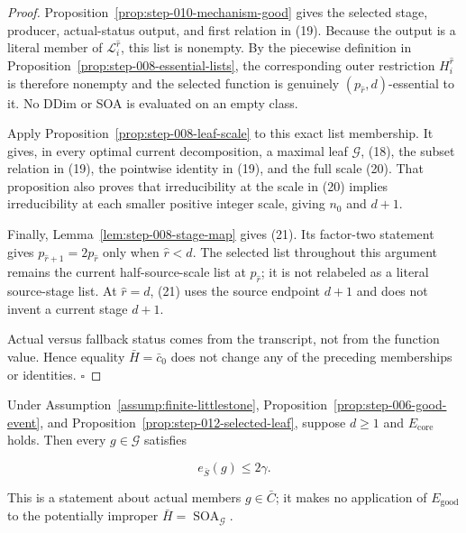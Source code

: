 \begin{proof}
Proposition~\ref{prop:step-010-mechanism-good} gives the selected stage,
producer, actual-status output, and first relation in (19). Because the
output is a literal member of \(\mathcal L_i^{\widehat r}\), this list is
nonempty. By the piecewise definition in Proposition~\ref{prop:step-008-essential-lists}, the corresponding outer
restriction \(H_i^{\widehat r}\) is therefore nonempty and the selected
function is genuinely \((p_{\widehat r},d)\)-essential to it. No DDim or
SOA is evaluated on an empty class.

Apply Proposition~\ref{prop:step-008-leaf-scale} to this exact
list membership. It gives, in every optimal current decomposition, a
maximal leaf \(\mathcal G\), (18), the subset relation in (19), the
pointwise identity in (19), and the full scale (20). That proposition also
proves that irreducibility at the scale in (20) implies irreducibility at
each smaller positive integer scale, giving \(n_0\) and \(d+1\).

Finally, Lemma~\ref{lem:step-008-stage-map} gives (21). Its
factor-two statement gives \(p_{\widehat r+1}=2p_{\widehat r}\) only when
\(\widehat r<d\). The selected list throughout this argument remains the
current half-source-scale list at \(p_{\widehat r}\); it is not relabeled
as a literal source-stage list. At \(\widehat r=d\), (21) uses the source
endpoint \(d+1\) and does not invent a current stage \(d+1\).

Actual versus fallback status comes from the  transcript, not from
the function value. Hence equality \(\bar H=\bar c_0\) does not change any
of the preceding memberships or identities. \(\square\)


\end{proof}

\begin{lemma}\label{lem:step-012-leaf-error}
Under Assumption~\ref{assump:finite-littlestone}, Proposition~\ref{prop:step-006-good-event}, and
Proposition~\ref{prop:step-012-selected-leaf}, suppose \(d\ge1\) and
\(E_{\mathrm{core}}\) holds. Then every \(g\in\mathcal G\) satisfies

\[
 e_{\bar S}(g)\le2\gamma.
\tag{22}
\]

This is a statement about actual members \(g\in\bar C\); it makes no
application of \(E_{\mathrm{good}}\) to the potentially improper
\(\bar H=\operatorname{SOA}_{\mathcal G}\).


\end{lemma}

